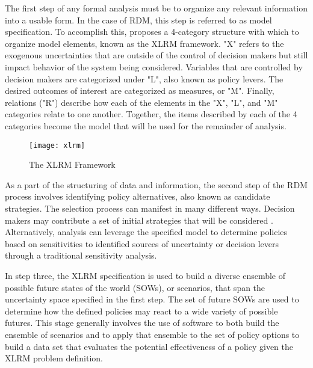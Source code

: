     The first step of any formal analysis must be to organize any relevant information into a usable form. In the case of RDM, this step is referred to as model specification. To accomplish this, \citet{Lempert2003} proposes a 4-category structure with which to organize model elements, known as the XLRM framework. "X" refers to the exogenous uncertainties that are outside of the control of decision makers but still impact behavior of the system being considered. Variables that are controlled by decision makers are categorized under "L", also known as policy levers. The desired outcomes of interest are categorized as measures, or "M". Finally, relations ("R") describe how each of the elements in the "X", "L", and "M" categories relate to one another. Together, the items described by each of the 4 categories become the model that will be used for the remainder of analysis.

    \begin{figure}[ht]
        \centering
        \captionsetup{justification=centering}
        
        \texttt{[image: xlrm]}
        \caption{The XLRM Framework \citep{Kwakkel2017}}
        \label{fig:xlrm}
    \end{figure}
    
    As a part of the structuring of data and information, the second step of the RDM process involves identifying policy alternatives, also known as candidate strategies. The selection process can manifest in many different ways. Decision makers may contribute a set of initial strategies that will be considered \citep{Lempert2006}. Alternatively, analysis can leverage the specified model to determine policies based on sensitivities to identified sources of uncertainty or decision levers through a traditional sensitivity analysis.
    
    In step three, the XLRM specification is used to build a diverse ensemble of possible future states of the world (SOWs), or scenarios, that span the uncertainty space specified in the first step. The set of future SOWs are used to determine how the defined policies may react to a wide variety of possible futures. This stage generally involves the use of software to both build the ensemble of scenarios and to apply that ensemble to the set of policy options to build a data set that evaluates the potential effectiveness of a policy given the XLRM problem definition. 


